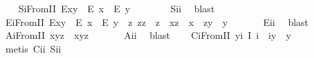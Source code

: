 \begin{isabellebody}
\begin{isamarkuptext}
\end{isamarkuptext}\isamarkuptrue%
\ \ \isamarkupfalse%
\ S\isactrlsub iFromII{\isacharcolon}\ {\isachardoublequoteopen}E{\isacharparenleft}x{\isasymcdot}y{\isacharparenright}\ \isactrlbold {\isasymrightarrow}\ {\isacharparenleft}E\ x\ \isactrlbold {\isasymand}\ E\ y{\isacharparenright}{\isachardoublequoteclose}\ \ \isanewline
%
\isadelimproof
\ \ \ \ %
\endisadelimproof
%
\isatagproof
{}\isamarkupfalse%
\ S\isactrlsub i\isactrlsub i\ \isamarkupfalse%
\ blast%
\endisatagproof
{\isafoldproof}%
%
\isadelimproof
\isanewline
%
\endisadelimproof
\ \ \isamarkupfalse%
\ E\isactrlsub iFromII{\isacharcolon}\ {\isachardoublequoteopen}E{\isacharparenleft}x{\isasymcdot}y{\isacharparenright}\ \isactrlbold {\isasymleftarrow}\ {\isacharparenleft}E\ x\ \isactrlbold {\isasymand}\ E\ y\ \isactrlbold {\isasymand}\ {\isacharparenleft}\isactrlbold {\isasymexists}z{\isachardot}\ z{\isasymcdot}z\ {\isasymcong}\ z\ \isactrlbold {\isasymand}\ x{\isasymcdot}z\ {\isasymcong}\ x\ \isactrlbold {\isasymand}\ z{\isasymcdot}y\ {\isasymcong}\ y{\isacharparenright}{\isacharparenright}{\isachardoublequoteclose}\ \isanewline
%
\isadelimproof
\ \ \ \ %
\endisadelimproof
%
\isatagproof
{}\isamarkupfalse%
\ E\isactrlsub i\isactrlsub i\ \isamarkupfalse%
\ blast%
\endisatagproof
{\isafoldproof}%
%
\isadelimproof
\isanewline
%
\endisadelimproof
\ \ \isamarkupfalse%
\ A\isactrlsub iFromII{\isacharcolon}\ {\isachardoublequoteopen}x{\isasymcdot}{\isacharparenleft}y{\isasymcdot}z{\isacharparenright}\ {\isasymcong}\ {\isacharparenleft}x{\isasymcdot}y{\isacharparenright}{\isasymcdot}z{\isachardoublequoteclose}\ \isanewline
%
\isadelimproof
\ \ \ \ %
\endisadelimproof
%
\isatagproof
{}\isamarkupfalse%
\ A\isactrlsub i\isactrlsub i\ \isamarkupfalse%
\ blast%
\endisatagproof
{\isafoldproof}%
%
\isadelimproof
\isanewline
%
\endisadelimproof
\ \ \isamarkupfalse%
\ C\isactrlsub iFromII{\isacharcolon}\ {\isachardoublequoteopen}\isactrlbold {\isasymforall}y{\isachardot}\isactrlbold {\isasymexists}i{\isachardot}\ I\ i\ \isactrlbold {\isasymand}\ i{\isasymcdot}y\ {\isasymcong}\ y{\isachardoublequoteclose}\ \isanewline
%
\isadelimproof
\ \ \ \ %
\endisadelimproof
%
\isatagproof
{}\isamarkupfalse%
\ {\isacharparenleft}metis\ C\isactrlsub i\isactrlsub i\ S\isactrlsub i\isactrlsub i{\isacharparenright}%
\endisatagproof
{\isafoldproof}%
%
\isadelimproof
\isanewline
%
\endisadelimproof
\ \ \isamarkupfalse%

\end{isabellebody}
